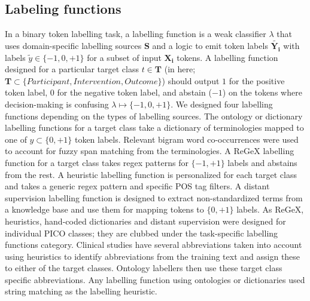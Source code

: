 \documentclass[10.7pt,]{article}
\begin{document}
\subsection{Labeling functions}\label{lfs}
%
In a binary token labelling task, a labelling function is a weak classifier $\lambda$ that uses domain-specific labelling sources $\bm{S}$ and a logic to emit token labels $ \widetilde{\bm{Y_{i}}}$ with labels $ \widetilde{y} \in \{-1, 0, +1\}$ for a subset of input $\bm{X_{i}}$ tokens.
A labelling function designed for a particular target class $t \in \bm{T}$ (in here; $\bm{T} \subset \{ Participant, Intervention, Outcome \} $) should output  $1$ for the positive token label, $0$ for the negative token label, and abstain ($-1$) on the tokens where decision-making is confusing $\lambda \mapsto \{-1, 0, +1\}$.
We designed four labelling functions depending on the types of labelling sources.
The ontology or dictionary labelling functions for a target class take a dictionary of terminologies mapped to one of $y \subset \{0, +1\} $ token labels.
Relevant bigram word co-occurrences were used to account for fuzzy span matching from the terminologies.
A ReGeX labelling function for a target class takes regex patterns for $\{-1, +1\}$ labels and abstains from the rest.
A heuristic labelling function is personalized for each target class and takes a generic regex pattern and specific POS tag filters.
A distant supervision labelling function is designed to extract non-standardized terms from a knowledge base and use them for mapping tokens to $\{0, +1\}$ labels.
As ReGeX, heuristics, hand-coded dictionaries and distant supervision were designed for individual PICO classes; they are clubbed under the task-specific labelling functions category.
Clinical studies have several abbreviations taken into account using heuristics to identify abbreviations from the training text and assign these to either of the target classes. 
Ontology labellers then use these target class specific abbreviations.
Any labelling function using ontologies or dictionaries used string matching as the labelling heuristic.
%
%
%
\end{document}
